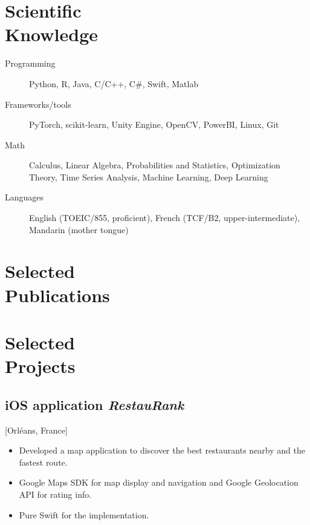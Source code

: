 \documentclass{mycv}
\begin{document}
\section{Scientific \\ Knowledge}

\begin{description}
  \item[Programming] Python, R, Java, C/C++, C\#, Swift, Matlab
  \item[Frameworks/tools] PyTorch, scikit-learn, Unity Engine, OpenCV, PowerBI, Linux, Git
  \item[Math] Calculus, Linear Algebra, Probabilities and Statistics, Optimization Theory, Time Series Analysis, Machine Learning, Deep Learning
  \item[Languages] English (TOEIC/855, proficient), French (TCF/B2, upper-intermediate), Mandarin (mother tongue)
\end{description}

\section{Selected \\ Publications}


\section{Selected \\ Projects}

\subsection{iOS application \textit{RestauRank}}[Orl\'eans, France]
\begin{positions}
\end{positions}

\begin{itemize}
  \item Developed a map application to discover the best restaurants nearby and the fastest route.
  \item Google Maps SDK for map display and navigation and Google Geolocation API for rating info.
  \item Pure Swift for the implementation.
\end{itemize}
\end{document}
